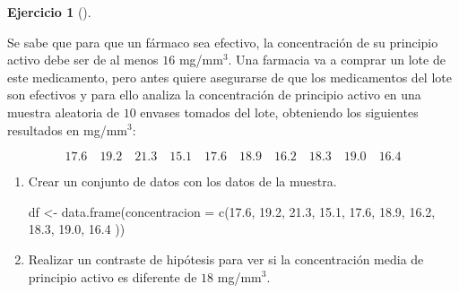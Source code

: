 \documentclass[
  a4paper,
]{scrreport}
\newenvironment{Shaded}{\begin{snugshade}}{\end{snugshade}}
\newcommand{\AttributeTok}[1]{\textcolor[rgb]{0.40,0.45,0.13}{#1}}
\newcommand{\FloatTok}[1]{\textcolor[rgb]{0.68,0.00,0.00}{#1}}
\newcommand{\FunctionTok}[1]{\textcolor[rgb]{0.28,0.35,0.67}{#1}}
\newcommand{\NormalTok}[1]{\textcolor[rgb]{0.00,0.23,0.31}{#1}}
\newcommand{\OtherTok}[1]{\textcolor[rgb]{0.00,0.23,0.31}{#1}}
\theoremstyle{definition}
\newtheorem{exercise}{Ejercicio}[chapter]
\theoremstyle{remark}
\begin{document}
\begin{exercise}[]\protect\hypertarget{exr-contraste-hipotesis-media-principio-activo}{}\label{exr-contraste-hipotesis-media-principio-activo}

Se sabe que para que un fármaco sea efectivo, la concentración de su
principio activo debe ser de al menos \(16\) mg/mm\(^3\). Una farmacia
va a comprar un lote de este medicamento, pero antes quiere asegurarse
de que los medicamentos del lote son efectivos y para ello analiza la
concentración de principio activo en una muestra aleatoria de \(10\)
envases tomados del lote, obteniendo los siguientes resultados en
mg/mm\(^{3}\):

\[
17.6 \quad 19.2 \quad 21.3 \quad 15.1 \quad 17.6 \quad 18.9 \quad 16.2 \quad 18.3 \quad 19.0 \quad 16.4
\]

\begin{enumerate}
\def\labelenumi{\alph{enumi}.}
\item
  Crear un conjunto de datos con los datos de la muestra.

  \begin{tcolorbox}[enhanced jigsaw, colframe=quarto-callout-tip-color-frame, toprule=.15mm, bottomtitle=1mm, breakable, opacitybacktitle=0.6, toptitle=1mm, colback=white, bottomrule=.15mm, title=\textcolor{quarto-callout-tip-color}{\faLightbulb}\hspace{0.5em}{Solución}, arc=.35mm, left=2mm, titlerule=0mm, rightrule=.15mm, coltitle=black, leftrule=.75mm, opacityback=0, colbacktitle=quarto-callout-tip-color!10!white]

\begin{Shaded}
\begin{Highlighting}[]
\NormalTok{df }\OtherTok{\textless{}{-}} \FunctionTok{data.frame}\NormalTok{(}\AttributeTok{concentracion =} \FunctionTok{c}\NormalTok{(}\FloatTok{17.6}\NormalTok{, }\FloatTok{19.2}\NormalTok{, }\FloatTok{21.3}\NormalTok{, }\FloatTok{15.1}\NormalTok{, }\FloatTok{17.6}\NormalTok{, }\FloatTok{18.9}\NormalTok{, }\FloatTok{16.2}\NormalTok{, }\FloatTok{18.3}\NormalTok{, }\FloatTok{19.0}\NormalTok{, }\FloatTok{16.4}\NormalTok{ ))}
\end{Highlighting}
\end{Shaded}

  \end{tcolorbox}
\item
  Realizar un contraste de hipótesis para ver si la concentración media
  de principio activo es diferente de \(18\) mg/mm\(^3\).

  \begin{tcolorbox}[enhanced jigsaw, colframe=quarto-callout-note-color-frame, toprule=.15mm, bottomtitle=1mm, breakable, opacitybacktitle=0.6, toptitle=1mm, colback=white, bottomrule=.15mm, title=\textcolor{quarto-callout-note-color}{\faInfo}\hspace{0.5em}{Ayuda}, arc=.35mm, left=2mm, titlerule=0mm, rightrule=.15mm, coltitle=black, leftrule=.75mm, opacityback=0, colbacktitle=quarto-callout-note-color!10!white]


\end{tcolorbox}
\end{enumerate}
\end{exercise}
\end{document}
